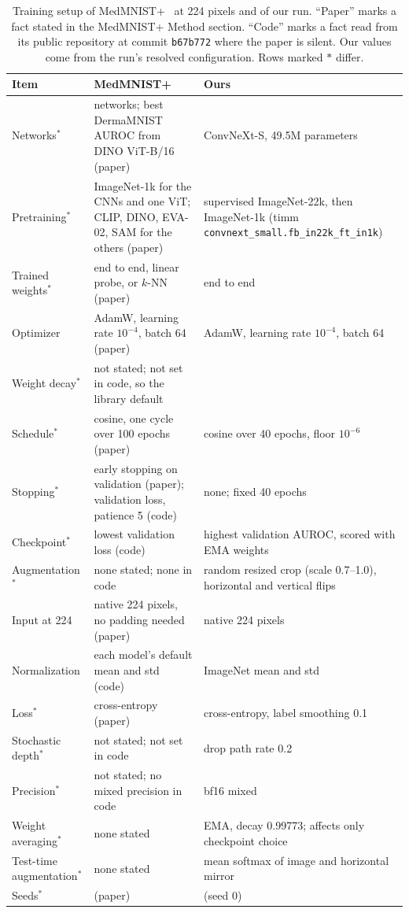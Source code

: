 \documentclass[conference]{IEEEtran}
\begin{document}
\begin{table}[t]
\caption{Training setup of MedMNIST+~\cite{doerrich2025medmnistplus} at 224 pixels and of our run. ``Paper'' marks a fact stated in the MedMNIST+ Method section. ``Code'' marks a fact read from its public repository at commit \texttt{b67b772} where the paper is silent. Our values come from the run's resolved configuration. Rows marked $\ast$ differ.}
\label{tab:setup}
\centering
\footnotesize
\renewcommand{\arraystretch}{1.1}
\begin{tabular}{@{}>{\raggedright\arraybackslash}p{}>{\raggedright\arraybackslash}p{}>{\raggedright\arraybackslash}p{}@{}}
\toprule
Item & MedMNIST+ & Ours \\
\midrule
Networks$^\ast$ & 10 networks; best DermaMNIST AUROC from DINO ViT-B/16 (paper) & ConvNeXt-S, 49.5M parameters \\
Pretraining$^\ast$ & ImageNet-1k for the CNNs and one ViT; CLIP, DINO, EVA-02, SAM for the others (paper) & supervised ImageNet-22k, then ImageNet-1k (timm \texttt{convnext\_small.fb\_in22k\_ft\_in1k}) \\
Trained weights$^\ast$ & end to end, linear probe, or $k$-NN (paper) & end to end \\
Optimizer & AdamW, learning rate $10^{-4}$, batch 64 (paper) & AdamW, learning rate $10^{-4}$, batch 64 \\
Weight decay$^\ast$ & not stated; not set in code, so the library default & 0.05 \\
Schedule$^\ast$ & cosine, one cycle over 100 epochs (paper) & cosine over 40 epochs, floor $10^{-6}$ \\
Stopping$^\ast$ & early stopping on validation (paper); validation loss, patience 5 (code) & none; fixed 40 epochs \\
Checkpoint$^\ast$ & lowest validation loss (code) & highest validation AUROC, scored with EMA weights \\
Augmentation$^\ast$ & none stated; none in code & random resized crop (scale 0.7--1.0), horizontal and vertical flips \\
Input at 224 & native 224 pixels, no padding needed (paper) & native 224 pixels \\
Normalization & each model's default mean and std (code) & ImageNet mean and std \\
Loss$^\ast$ & cross-entropy (paper) & cross-entropy, label smoothing 0.1 \\
Stochastic depth$^\ast$ & not stated; not set in code & drop path rate 0.2 \\
Precision$^\ast$ & not stated; no mixed precision in code & bf16 mixed \\
Weight averaging$^\ast$ & none stated & EMA, decay 0.99773; affects only checkpoint choice \\
Test-time augmentation$^\ast$ & none stated & mean softmax of image and horizontal mirror \\
Seeds$^\ast$ & 3 (paper) & 1 (seed 0) \\
\bottomrule
\end{tabular}
\end{table}
\end{document}
